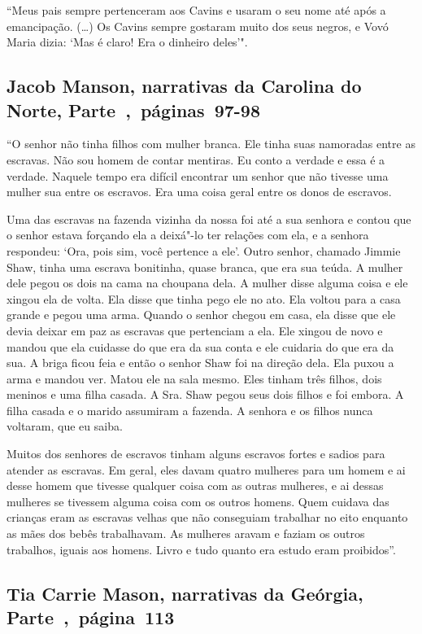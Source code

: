 ``Meus pais sempre pertenceram aos Cavins e usaram o seu nome até após a
emancipação. (\ldots{}) Os Cavins sempre gostaram muito dos seus negros,
e Vovó Maria dizia: `Mas é claro! Era o dinheiro deles'".

\subsection{Jacob Manson, narrativas da Carolina do Norte, Parte~,~páginas~97-98}
\label{ref181}

``O senhor não tinha filhos com mulher branca. Ele tinha suas namoradas
entre as escravas. Não sou homem de contar mentiras. Eu conto a verdade
e essa é a verdade. Naquele tempo era difícil encontrar um senhor que
não tivesse uma mulher sua entre os escravos. Era uma coisa geral entre
os donos de escravos.

Uma das escravas na fazenda vizinha da nossa foi até a sua senhora e
contou que o senhor estava forçando ela a deixá"-lo ter relações com ela,
e a senhora respondeu: `Ora, pois sim, você pertence a ele'. Outro
senhor, chamado Jimmie Shaw, tinha uma escrava bonitinha, quase branca,
que era sua teúda. A mulher dele pegou os dois na cama na choupana dela.
A mulher disse alguma coisa e ele xingou ela de volta. Ela disse que
tinha pego ele no ato. Ela voltou para a casa grande e pegou uma arma.
Quando o senhor chegou em casa, ela disse que ele devia deixar em paz as
escravas que pertenciam a ela. Ele xingou de novo e mandou que ela
cuidasse do que era da sua conta e ele cuidaria do que era da sua. A
briga ficou feia e então o senhor Shaw foi na direção dela. Ela puxou a
arma e mandou ver. Matou ele na sala mesmo. Eles tinham três filhos,
dois meninos e uma filha casada. A Sra. Shaw pegou seus dois filhos e
foi embora. A filha casada e o marido assumiram a fazenda. A senhora e
os filhos nunca voltaram, que eu saiba.

Muitos dos senhores de escravos tinham alguns escravos fortes e sadios
para atender as escravas. Em geral, eles davam quatro mulheres para um
homem e ai desse homem que tivesse qualquer coisa com as outras
mulheres, e ai dessas mulheres se tivessem alguma coisa com os outros
homens. Quem cuidava das crianças eram as escravas velhas que não
conseguiam trabalhar no eito enquanto as mães dos bebês trabalhavam. As
mulheres aravam e faziam os outros trabalhos, iguais aos homens. Livro e
tudo quanto era estudo eram proibidos''.

\subsection{Tia Carrie Mason, narrativas da Geórgia, Parte~,~página~113}
\label{ref183}

